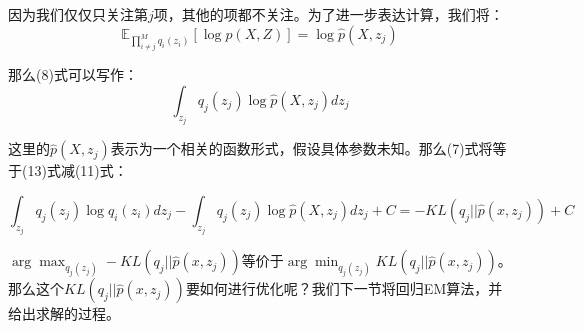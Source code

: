 \documentclass[a4paper]{article}
\begin{document}
因为我们仅仅只关注第$j$项，其他的项都不关注。为了进一步表达计算，我们将：
\begin{equation}
    \mathbb{E}_{\prod_{i \neq j}^Mq_i(z_i)}\left[ \log p(X,Z) \right] = \log \hat{p}(X,z_j)
\end{equation}

那么(8)式可以写作：
\begin{equation}
    \int_{z_j}q_j(z_j) \log \hat{p}(X,z_j) dz_j
\end{equation}

这里的$\hat{p}(X,z_j)$表示为一个相关的函数形式，假设具体参数未知。那么(7)式将等于(13)式减(11)式：

\begin{equation}
    \int_{z_j} q_j(z_j)\log q_i(z_i) dz_j - \int_{z_j}q_j(z_j) \log \hat{p}(X,z_j) dz_j + C = -KL(q_j || \hat{p}(x,z_j)) + C
\end{equation}

$\arg\max_{q_j(z_j)}-KL(q_j || \hat{p}(x,z_j))$等价于$\arg\min_{q_j(z_j)}KL(q_j || \hat{p}(x,z_j))$。那么这个$KL(q_j || \hat{p}(x,z_j))$要如何进行优化呢？我们下一节将回归EM算法，并给出求解的过程。



\end{document}
